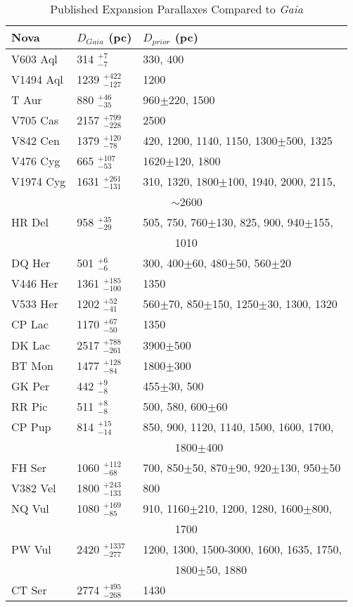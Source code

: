 \documentclass[a4paper,fleqn,usenatbib]{mnras}
\begin{document}
\begin{table}
	\centering
	\caption{Published Expansion Parallaxes Compared to {\it Gaia}}
	\begin{tabular}{lll} 
		\hline
		Nova & $D_{Gaia}$ (pc) & $D_{prior}$ (pc)\\
		\hline
V603 Aql	&	314	$_{-	7	}^{+	7	}$ &	330, 400	\\
V1494 Aql	&	1239	$_{-	127	}^{+	422	}$ &	1200	\\
T Aur	&	880	$_{-	35	}^{+	46	}$ &	960$\pm$220, 1500	\\
V705 Cas	&	2157	$_{-	228	}^{+	799	}$ &	2500	\\
V842 Cen	&	1379	$_{-	78	}^{+	120	}$ &	420, 1200, 1140, 1150, 1300$\pm$500, 1325	\\
V476 Cyg	&	665	$_{-	53	}^{+	107	}$ &	1620$\pm$120, 1800	\\
V1974 Cyg	&	1631	$_{-	131	}^{+	261	}$ &	310, 1320, 1800$\pm$100, 1940, 2000, 2115,  \\
  &  &~~~~~$\sim$2600 	\\
HR Del	&	958	$_{-	29	}^{+	35	}$ &	 505, 750, 760$\pm$130, 825, 900, 940$\pm$155,  \\
  &  &~~~~~ 1010	\\
DQ Her	&	501	$_{-	6	}^{+	6	}$ &	300, 400$\pm$60, 480$\pm$50, 560$\pm$20	\\
V446 Her	&	1361	$_{-	100	}^{+	185	}$ &	1350	\\
V533 Her	&	1202	$_{-	41	}^{+	52	}$ &	560$\pm$70, 850$\pm$150, 1250$\pm$30, 1300, 1320	\\
CP Lac	&	1170	$_{-	50	}^{+	67	}$ &	1350	\\
DK Lac	&	2517	$_{-	261	}^{+	788	}$ &	3900$\pm$500	\\
BT Mon	&	1477	$_{-	84	}^{+	128	}$ &	1800$\pm$300	\\
GK Per	&	442	$_{-	8	}^{+	9	}$ &	455$\pm$30, 500	\\
RR Pic	&	511	$_{-	8	}^{+	8	}$ &	500, 580, 600$\pm$60	\\
CP Pup	&	814	$_{-	14	}^{+	15	}$ &	850, 900, 1120, 1140, 1500, 1600, 1700,  \\
  &  &~~~~~ 1800$\pm$400	\\
FH Ser	&	1060	$_{-	68	}^{+	112	}$ &	700, 850$\pm$50, 870$\pm$90, 920$\pm$130, 950$\pm$50	\\
V382 Vel	&	1800	$_{-	133	}^{+	243	}$ &	800	\\
NQ Vul	&	1080	$_{-	85	}^{+	169	}$ &	910, 1160$\pm$210, 1200, 1280, 1600$\pm$800,  \\
  &  &~~~~~ 1700	\\
PW Vul	&	2420	$_{-	277	}^{+	1337	}$ &	1200, 1300, 1500-3000, 1600, 1635, 1750,  \\
  &  &~~~~~ 1800$\pm$50, 1880	\\
CT Ser	&	2774	$_{-	268	}^{+	495	}$ &	1430	\\
		\hline
	\end{tabular}
\end{table}
\end{document}
